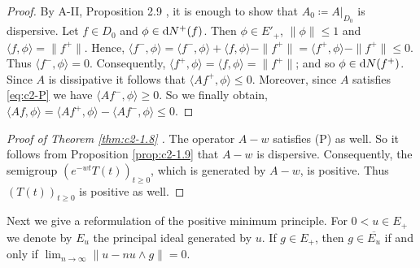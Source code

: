 \begin{proof}
By A-II, Proposition 2.9
, it is enough to show that $A_{0} \coloneqq A|_{D_{0}}$ is dispersive.
Let $f \in D_{0}$ and $\phi \in \mathop{}\!\mathrm{d}{N^{+}}(f)$.
Then $\phi \in E'_{+}$, $\|\phi\| \leq 1$ and $\langle f,\phi \rangle = \|f^{+}\|$.
Hence, $\langle f^{-},\phi \rangle = \langle f^{-},\phi \rangle + \langle f,\phi \rangle - \|f^{+}\| = \langle f^{+},\phi \rangle - \|f^{+}\| \leq 0$.
Thus $\langle f^{-},\phi \rangle = 0$.
Consequently, $\langle f^{+},\phi \rangle = \langle f,\phi \rangle = \|f^{+}\|$; and so $\phi \in \mathop{}\!\mathrm{d}{N}(f^{+})$.
Since $A$ is dissipative it follows that $\langle Af^{+},\phi \rangle \leq 0$.
Moreover, since $A$ satisfies 
 \eqref{eq:c2-P}
we have $\langle Af^{-},\phi \rangle \geq 0$.
So we finally obtain, $\langle Af,\phi \rangle = \langle Af^{+},\phi \rangle - \langle Af^{-},\phi \rangle \leq 0$.
\end{proof}

\begin{proof}[Proof of Theorem \ref{thm:c2-1.8}  ]
The operator $A - w$ satisfies (P) 
as well.
So it follows from Proposition \ref{prop:c2-1.9}   that $A - w$ is dispersive.
Consequently, the semigroup $(e^{-wt}T(t))_{t \geq 0}$, which is generated by $A - w$, is positive.
Thus $(T(t))_{t \geq 0}$ is positive as well.
\end{proof}

Next we give a reformulation of the positive minimum principle.
For $0 < u \in E_{+}$ we denote by $E_{u}$ the principal ideal generated by $u$.
If $g \in E_{+}$, then $g \in \overline{E_{u}}$ if and only if $\lim_{n \to \infty} \|u - n u \wedge g\| = 0$.

